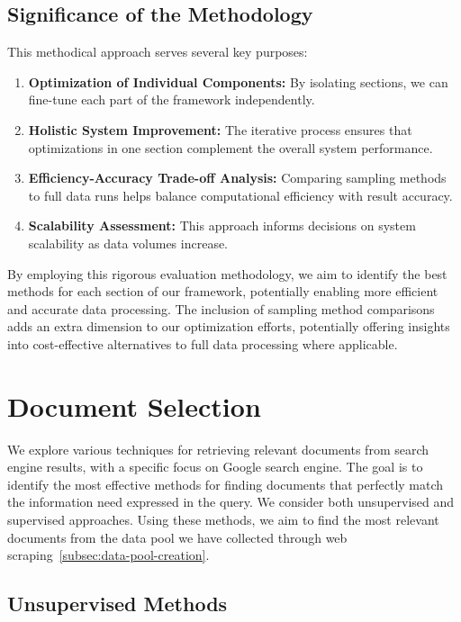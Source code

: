 \subsection{Significance of the Methodology}\label{subsec:significance-of-the-methodology}
This methodical approach serves several key purposes:

\begin{enumerate}
    \item \textbf{Optimization of Individual Components:} By isolating sections, we can fine-tune each part of the framework independently.
    \item \textbf{Holistic System Improvement:} The iterative process ensures that optimizations in one section complement the overall system performance.
    \item \textbf{Efficiency-Accuracy Trade-off Analysis:} Comparing sampling methods to full data runs helps balance computational efficiency with result accuracy.
    \item \textbf{Scalability Assessment:} This approach informs decisions on system scalability as data volumes increase.
\end{enumerate}

By employing this rigorous evaluation methodology, we aim to identify the best methods for each section of our framework, potentially enabling more efficient and accurate data processing.
The inclusion of sampling method comparisons adds an extra dimension to our optimization efforts, potentially offering insights into cost-effective alternatives to full data processing where applicable.

\section{Document Selection}\label{sec:document-selection}
We explore various techniques for retrieving relevant documents from search engine results, with a specific focus on Google search engine.
The goal is to identify the most effective methods for finding documents that perfectly match the information need expressed in the query.
We consider both unsupervised and supervised approaches.
Using these methods, we aim to find the most relevant documents from the data pool we have collected through web scraping~\ref{subsec:data-pool-creation}.
\subsection{Unsupervised Methods}\label{subsec:unsupervised-methods}
